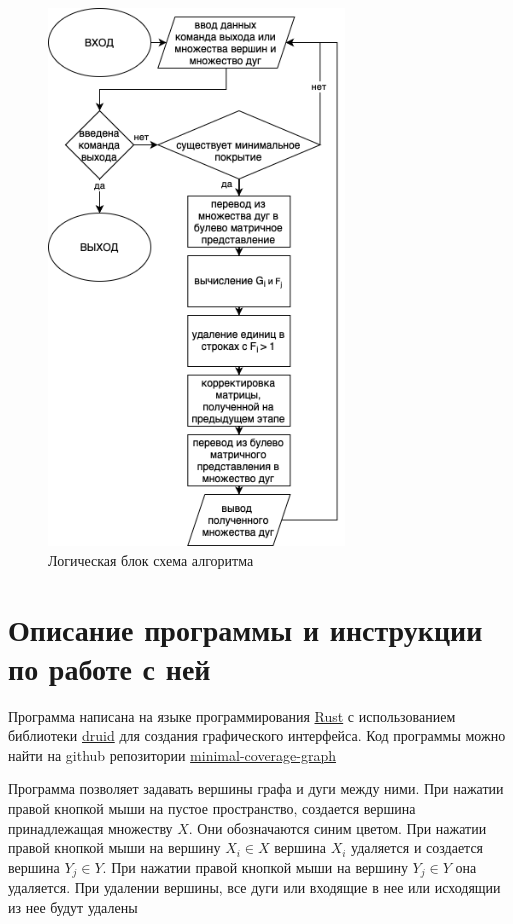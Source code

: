 \documentclass[12pt]{article}
\begin{document}
\begin{figure}[H]
    \centering
    \includegraphics[width=0.7\textwidth]{diagram.png}
    \caption{Логическая блок схема алгоритма}
    \label{fig:block_diagram}
\end{figure}

\section{Описание программы и инструкции по работе с ней}

Программа написана на языке программирования
\href{https://www.rust-lang.org}{Rust}
с использованием библиотеки
\href{https://github.com/linebender/druid}{druid} для
создания графического интерфейса. Код программы можно найти
на github репозитории
\href{https://github.com/zggff/minimal-coverage-graph}{minimal-coverage-graph}

Программа позволяет задавать вершины графа и дуги между ними. При нажатии
правой кнопкой мыши на пустое пространство, создается вершина принадлежащая
множеству $X$. Они обозначаются синим цветом.
При нажатии правой кнопкой мыши на вершину $X_i \in X$ вершина $X_i$ удаляется
и создается вершина $Y_j \in Y$. При нажатии правой кнопкой мыши
на вершину $Y_j \in Y$ она удаляется. При удалении вершины, все дуги
или входящие в нее или исходящии из нее будут удалены
\end{document}
